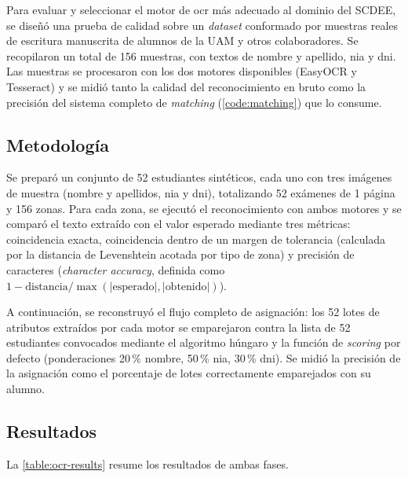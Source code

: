 Para evaluar y seleccionar el motor de \acs{ocr} más adecuado al dominio
del SCDEE, se diseñó una prueba de calidad sobre un \textit{dataset}
conformado por muestras reales de escritura manuscrita de alumnos de
la UAM y otros colaboradores. Se recopilaron un total de 156 muestras,
con textos de nombre y apellido, \acs{nia} y \acs{dni}.
Las muestras se procesaron con los dos motores
disponibles (EasyOCR y Tesseract) y se midió tanto la calidad del
reconocimiento en bruto como la precisión del sistema completo de
\textit{matching} (\cref{code:matching}) que lo consume.

\subsection{Metodología}

Se preparó un conjunto de 52 estudiantes sintéticos, cada uno con tres
imágenes de muestra (nombre y apellidos, \acs{nia} y \acs{dni}), totalizando
52 exámenes de 1 página y 156 zonas. Para cada zona, se ejecutó el reconocimiento con ambos
motores y se comparó el texto extraído con el valor esperado mediante
tres métricas: coincidencia exacta, coincidencia dentro de un margen de
tolerancia (calculada por la distancia de Levenshtein acotada por tipo de zona) y
precisión de caracteres (\textit{character accuracy}, definida como
\(1 - \text{distancia} / \max(|\text{esperado}|, |\text{obtenido}|)\)).

A continuación, se reconstruyó el flujo completo de asignación: los 52
lotes de atributos extraídos por cada motor se emparejaron contra la
lista de 52 estudiantes convocados mediante el algoritmo húngaro y la
función de \textit{scoring} por defecto (ponderaciones 20\,\% nombre,
50\,\% \acs{nia}, 30\,\% \acs{dni}). Se midió la precisión de la
asignación como el porcentaje de lotes correctamente emparejados con su
alumno.

\subsection{Resultados}

La \cref{table:ocr-results} resume los resultados de ambas fases.

